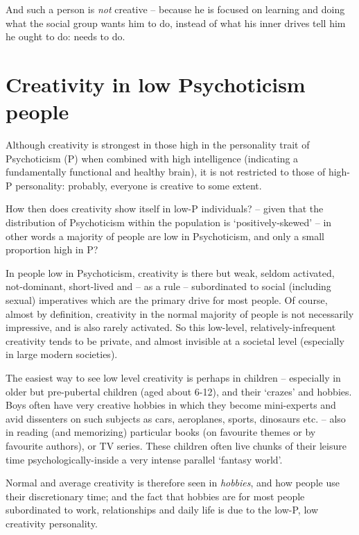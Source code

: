 \documentclass[
]{book}
\begin{document}
And such a person is \emph{not} creative -- because he is focused on learning and doing what the social group wants him to do, instead of what his inner drives tell him he ought to do: needs to do.

\hypertarget{creativity-in-low-psychoticism-people}{%
\section{Creativity in low Psychoticism people}\label{creativity-in-low-psychoticism-people}}

Although creativity is strongest in those high in the personality trait of Psychoticism (P) when combined with high intelligence (indicating a fundamentally functional and healthy brain), it is not restricted to those of high-P personality: probably, everyone is creative to some extent.

How then does creativity show itself in low-P individuals? -- given that the distribution of Psychoticism within the population is `positively-skewed' -- in other words a majority of people are low in Psychoticism, and only a small proportion high in P?

In people low in Psychoticism, creativity is there but weak, seldom activated, not-dominant, short-lived and -- as a rule -- subordinated to social (including sexual) imperatives which are the primary drive for most people. Of course, almost by definition, creativity in the normal majority of people is not necessarily impressive, and is also rarely activated. So this low-level, relatively-infrequent creativity tends to be private, and almost invisible at a societal level (especially in large modern societies).

The easiest way to see low level creativity is perhaps in children -- especially in older but pre-pubertal children (aged about 6-12), and their `crazes' and hobbies. Boys often have very creative hobbies in which they become mini-experts and avid dissenters on such subjects as cars, aeroplanes, sports, dinosaurs etc. -- also in reading (and memorizing) particular books (on favourite themes or by favourite authors), or TV series. These children often live chunks of their leisure time psychologically-inside a very intense parallel `fantasy world'.

Normal and average creativity is therefore seen in \emph{hobbies}, and how people use their discretionary time; and the fact that hobbies are for most people subordinated to work, relationships and daily life is due to the low-P, low creativity personality.
\end{document}
